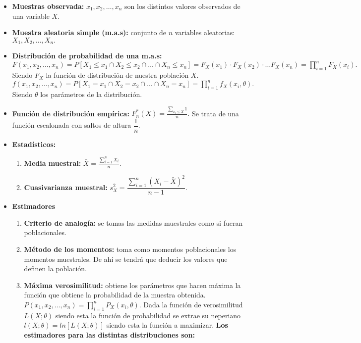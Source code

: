 \documentclass[a4paper, twocolumn, 10pt]{article}
\begin{document}
\begin{itemize}
	\item \textbf{Muestras observada:} $x_1, x_2, \ldots, x_n$ son los distintos valores observados de una variable $X.$
	\item \textbf{Muestra aleatoria simple (m.a.s):} conjunto de $n$ variables aleatorias: $X_1, X_2, \ldots, X_n.$
	\item \textbf{Distribución de probabilidad de una m.a.s:} $F(x_1, x_2, \ldots, x_n) = P\left[X_1\leq x_1 \cap X_2 \leq x_2 \cap \ldots \cap X_n \leq x_n\right] = F_X(x_1)\cdot F_X(x_2) \cdot \ldots F_X(x_n) = \displaystyle \prod\limits_{i=1}^{n}F_X(x_i).$ Siendo $F_X$ la función de distribución de nuestra población $X.$ $f(x_1, x_2, \ldots, x_n) = P\left[X_1= x_1 \cap X_2 = x_2 \cap \ldots \cap X_n = x_n\right] =  \displaystyle \prod\limits_{i=1}^{n}f_X(x_i, \theta).$ Siendo $\theta$ los parámetros de la distribución.
	\item \textbf{Función de distribución empírica:} $F_n^\ast(X) = \displaystyle \frac{\sum\limits_{x_i \leq X} 1}{n}.$ Se trata de una función escalonada con saltos de altura $\dfrac{1}{n}.$
	\item \textbf{Estadísticos:}
	\begin{enumerate}
		\item \textbf{Media muestral:} $\displaystyle \bar{X} = \frac{\sum\limits_{i=1}^{n}X_i}{n}.$
		\item \textbf{Cuasivarianza muestral:} $s^2_X = \dfrac{\sum\limits_{i=1}^{n}\left(X_i - \bar{X}\right)^2}{n - 1}.$
	\end{enumerate}
	\item \textbf{Estimadores}
	\begin{enumerate}
		\item \textbf{Criterio de analogía:} se tomas las medidas muestrales como si fueran poblacionales.
		\item \textbf{Método de los momentos:} toma como momentos poblacionales los momentos muestrales. De ahí se tendrá que deducir los valores que definen la población.
		\item \textbf{Máxima verosimilitud:} obtiene los parámetros que hacen máxima la función que obtiene la probabilidad de la muestra obtenida. $P(x_1, x_2, \ldots, x_n) = \displaystyle \prod\limits_{i=1}^{n}P_X(x_i, \theta).$ Dada la función de verosimilitud $L(X;\theta)$ siendo esta la función de probabilidad se extrae su neperiano $l(X;\theta) = ln\left[L(X;\theta)\right]$ siendo esta la función a maximizar. \textbf{Los estimadores para las distintas distribuciones son:}

\end{enumerate}
\end{itemize}
\end{document}
